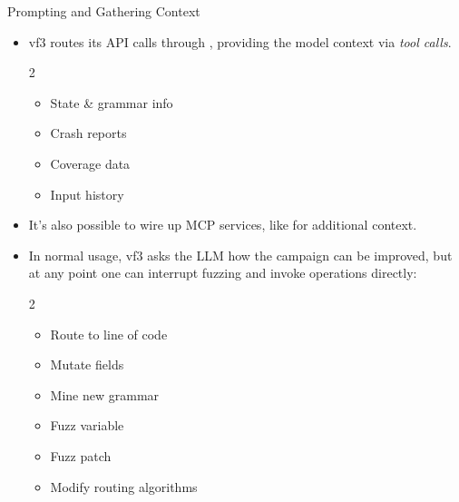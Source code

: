 \begin{frame}{Prompting and Gathering Context}
    \begin{itemize}
        \item vf3 routes its API calls through ,
        providing the model context via \textit{\color{themetitle}tool calls}.
        \begin{multicols}{2}
            \begin{itemize}
                \item State \& grammar info
                \item Crash reports
                \item Coverage data
                \item Input history
            \end{itemize}
        \end{multicols}
    \item It's also possible to wire up MCP services, like 
        for additional context.
    \item In normal usage, vf3 asks the LLM how the campaign can be improved, but at any point one
        can interrupt fuzzing and invoke operations directly:
        \begin{multicols}{2}
            \begin{itemize}
                \item Route to line of code
                \item Mutate fields
                \item Mine new grammar
                \item Fuzz variable
                \item Fuzz patch
                \item Modify routing algorithms
            \end{itemize}
        \end{multicols}
    \end{itemize}
    \vspace{-0.4cm}
\end{frame}

